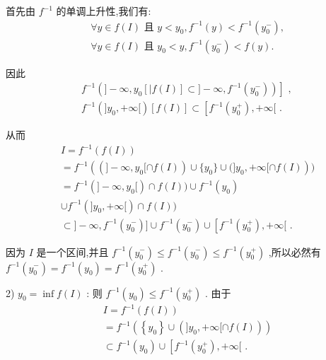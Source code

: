首先由 ${f}^{-1}$ 的单调上升性,我们有:
\begin{align*}
	&\forall y \in  f\left( I\right) \text{ 且 }y < {y}_{0},{f}^{-1}\left( y\right)  < {f}^{-1}\left( {y}_{0}^{ - }\right) ,\\
	&\forall y \in  f\left( I\right) \text{ 且 }{y}_{0} < y,{f}^{-1}\left( {y}_{0}^{ - }\right)  < f\left( y\right) .
\end{align*}

因此
\begin{align*}
	&\left. {{f}^{-1}\left( {\rbrack  - \infty ,{y}_{0}\left\lbrack  {\mid f\left( I\right) }\right\rbrack   \subset  \rbrack  - \infty ,{f}^{-1}\left( {y}_{0}^{ - }\right) }\right) }\right\rbrack  \text{ , }\\
	&{f}^{-1}\left( {\rbrack {y}_{0}, + \infty \lbrack }\right) \left\lbrack  {f\left( I\right) }\right\rbrack   \subset  \left\lbrack  {{f}^{-1}\left( {y}_{0}^{ + }\right) , + \infty \lbrack }\right. \text{ . }
\end{align*}

从而
\begin{align*}
	&I = {f}^{-1}\left( {f\left( I\right) }\right)\\
	&= {f}^{-1}\left( {\left( {\rbrack  - \infty ,{y}_{0}\lbrack  \cap  f\left( I\right) }\right) \cup \{ {y}_{0}\} \cup (\rbrack {y}_{0}, + \infty \lbrack  \cap  f\left( I\right) }\right) )\\
	&= {f}^{-1}\left( {\rbrack  - \infty ,{y}_{0}\lbrack }\right)  \cap  f\left( I\right) ) \cup  {f}^{-1}\left( {y}_{0}\right)\\
	&\cup  {f}^{-1}\left( {\rbrack {y}_{0}, + \infty \lbrack }\right)  \cap  f\left( I\right) )\\
	&\subset  \rbrack  - \infty ,{f}^{-1}\left( {y}_{0}^{ - }\right) \rbrack  \cup  {f}^{-1}\left( {y}_{0}^{ - }\right)  \cup  \left\lbrack  {{f}^{-1}\left( {y}_{0}^{ + }\right) , + \infty \lbrack }\right. \text{ . }
\end{align*}

因为 $I$ 是一个区间,并且 ${f}^{-1}\left( {y}_{0}^{ - }\right)  \leq  {f}^{-1}\left( {y}_{0}^{ - }\right)  \leq  {f}^{-1}\left( {y}_{0}^{ + }\right)$ ,所以必然有 ${f}^{-1}\left( {y}_{0}^{ - }\right)  = {f}^{-1}\left( {y}_{0}\right)  = {f}^{-1}\left( {y}_{0}^{ + }\right)$ .

2) ${y}_{0} = \inf f\left( I\right)$ : 则 ${f}^{-1}\left( {y}_{0}\right)  \leq  {f}^{-1}\left( {y}_{0}^{ + }\right)$ . 由于
\begin{align*}
	&I = {f}^{-1}\left( {f\left( I\right) }\right)\\
	&= {f}^{-1}\left( {\left\{  {y}_{0}\right\}   \cup  \left( {\rbrack {y}_{0}, + \infty \lbrack  \cap  f\left( I\right) }\right) }\right)\\
	&\subset  {f}^{-1}\left( {y}_{0}\right)  \cup  \left\lbrack  {{f}^{-1}\left( {y}_{0}^{ + }\right) , + \infty \lbrack }\right. \text{ . }
\end{align*}

